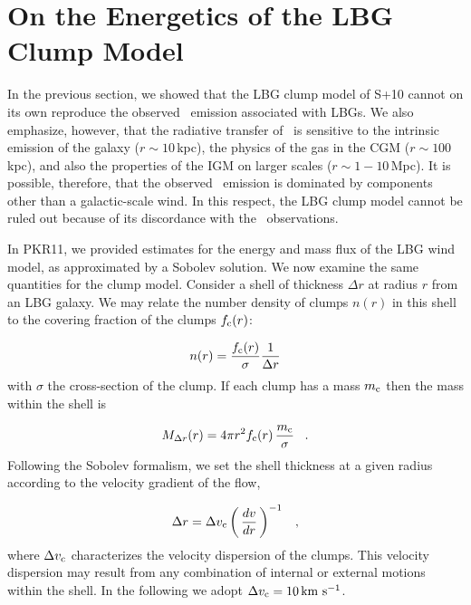 \documentclass[12pt,preprint]{aastex}
\begin{document}
\section{On the Energetics of the LBG Clump Model}
\label{sec:energy}

In the previous section, we showed that the LBG clump model
of S+10 cannot on its own reproduce the observed \lya\ emission associated with
LBGs.   We also emphasize, however, that the radiative transfer of
\lya\ is sensitive to the intrinsic emission of the galaxy ($r \sim
10$\,kpc), the physics of the gas in the CGM ($r \sim 100$\,kpc), and
also the properties of the IGM on larger scales ($r \sim 1-10$\,Mpc).
It is possible, therefore, that the observed \lya\ emission is
dominated by components other than a galactic-scale wind.
In this respect, the LBG clump
model cannot be ruled out because of its discordance with the \lya\
observations.

In PKR11, we provided estimates for the energy and mass flux of the
LBG wind model, as approximated by a Sobolev solution.  We now
examine the same quantities for the clump model.  Consider a shell of
thickness $\Delta r$ at radius $r$ from an LBG galaxy.  We may relate
the number density of clumps $n(r)$ in this shell to the covering
fraction of the clumps $f_{\rm c}(r)$:

\begin{equation}
n(r) = \frac{f_{\rm c}(r)}{\sigma} \frac{1}{\Delta r}
\label{eqn:density}
\end{equation}
with $\sigma$ the cross-section of the clump.  If each clump has a
mass $m_{\rm c}$ then the mass within the shell is

\begin{equation}
M_{\Delta r}(r) = 4\pi r^2 f_{\rm c}(r) \, \frac{m_{\rm c}}{\sigma}
\;\;\; .
\label{eqn:mshell}
\end{equation}
Following the Sobolev formalism, we set the shell thickness at a given
radius according to the velocity gradient of the flow,

\begin{equation}
\Delta r = \Delta v_{\rm c} \left ( \, \frac{dv}{dr} \, \right )^{-1} \;\;\; ,
\end{equation}
where $\Delta v_{\rm c}$ characterizes the velocity dispersion of the
clumps.  This velocity dispersion may result from any combination of internal or external motions within
the shell.  In the following we adopt $\Delta v_{\rm c} = 10 \, {\rm km~s^{-1}}$.
\end{document}
